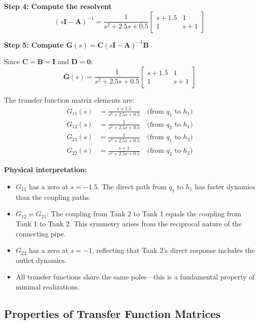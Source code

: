 \begin{example}
\textbf{Step 4: Compute the resolvent}
\begin{equation}
(s\mathbf{I} - \mathbf{A})^{-1} = \frac{1}{s^2 + 2.5s + 0.5}\begin{bmatrix} s+1.5 & 1 \\ 1 & s+1 \end{bmatrix}
\end{equation}

\textbf{Step 5: Compute $\mathbf{G}(s) = \mathbf{C}(s\mathbf{I} - \mathbf{A})^{-1}\mathbf{B}$}

Since $\mathbf{C} = \mathbf{B} = \mathbf{I}$ and $\mathbf{D} = \mathbf{0}$:
\begin{equation}
\mathbf{G}(s) = \frac{1}{s^2 + 2.5s + 0.5}\begin{bmatrix} s+1.5 & 1 \\ 1 & s+1 \end{bmatrix}
\end{equation}

The transfer function matrix elements are:
\begin{align}
G_{11}(s) &= \frac{s+1.5}{s^2 + 2.5s + 0.5} \quad \text{(from $q_1$ to $h_1$)} \\
G_{12}(s) &= \frac{1}{s^2 + 2.5s + 0.5} \quad \text{(from $q_2$ to $h_1$)} \\
G_{21}(s) &= \frac{1}{s^2 + 2.5s + 0.5} \quad \text{(from $q_1$ to $h_2$)} \\
G_{22}(s) &= \frac{s+1}{s^2 + 2.5s + 0.5} \quad \text{(from $q_2$ to $h_2$)}
\end{align}

\textbf{Physical interpretation:}
\begin{itemize}
\item $G_{11}$ has a zero at $s = -1.5$. The direct path from $q_1$ to $h_1$ has faster dynamics than the coupling paths.
\item $G_{12} = G_{21}$: The coupling from Tank 2 to Tank 1 equals the coupling from Tank 1 to Tank 2. This symmetry arises from the reciprocal nature of the connecting pipe.
\item $G_{22}$ has a zero at $s = -1$, reflecting that Tank 2's direct response includes the outlet dynamics.
\item All transfer functions share the same poles---this is a fundamental property of minimal realizations.
\end{itemize}
\end{example}

\subsection{Properties of Transfer Function Matrices}

